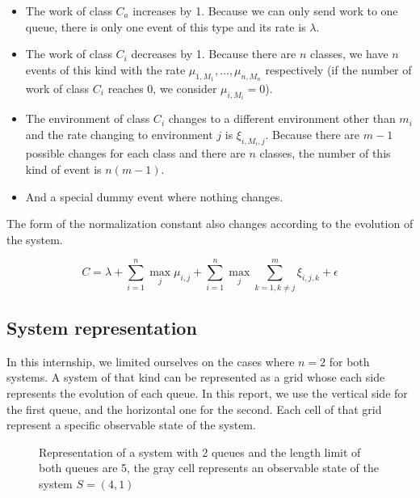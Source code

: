 \documentclass[
  a4paper, xcolor = usenames,dvipsnames]{article}
\providecommand{\tightlist}{%
  \setlength{\itemsep}{0pt}\setlength{\parskip}{0pt}}
\begin{document}
\begin{itemize}
\tightlist
\item
  The work of class \(C_{a}\) increases by 1. Because we can only send work to one queue, there is only one event of this type and its rate is \(\lambda\).
\item
  The work of class \(C_{i}\) decreases by 1. Because there are \(n\) classes, we have \(n\) events of this kind with the rate \(\mu_{1, M_{1}}, \dots, \mu_{n, M_{n}}\) respectively (if the number of work of class \(C_{i}\) reaches 0, we consider \(\mu_{i, M_{i}} = 0\)).
\item
  The environment of class \(C_{i}\) changes to a different environment other than \(m_{i}\) and the rate changing to environment \(j\) is \(\xi_{i, M_{i}, j}\). Because there are \(m - 1\) possible changes for each class and there are \(n\) classes, the number of this kind of event is \(n(m - 1)\).
\item
  And a special dummy event where nothing changes.
\end{itemize}

The form of the normalization constant also changes according to the evolution of the system.

\[
C = \lambda + \sum_{i = 1}^{n} \max_{j} \mu_{i, j} + \sum_{i = 1}^{n} \max_{j} \sum_{k = 1, k \neq j}^{m} \xi_{i, j, k} + \epsilon
\]

\hypertarget{system-representation}{%
\subsection{System representation}\label{system-representation}}

In this internship, we limited ourselves on the cases where \(n = 2\) for both systems. A system of that kind can be represented as a grid whose each side represents the evolution of each queue. In this report, we use the vertical side for the first queue, and the horizontal one for the second. Each cell of that grid represent a specific observable state of the system.

\begin{figure}
\centering
\def\mycolumns{5}
\def\myrows{5}
\caption[Representation of a system with 2 queues]{Representation of a system with 2 queues and the length limit of both queues are 5, the gray cell represents an observable state of the system $S = (4, 1)$}
\end{figure}
\end{document}
